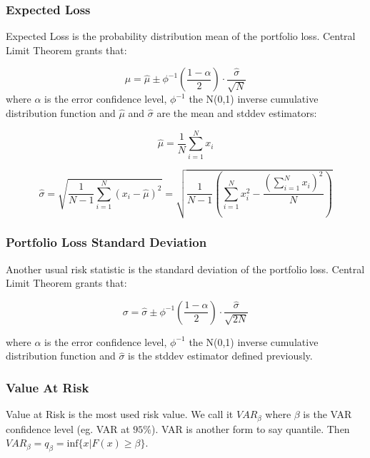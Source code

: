 \documentclass[a4paper,12pt,final]{article}
\begin{document}
\subsubsection{Expected Loss}
Expected Loss is the probability distribution mean of the portfolio loss.
Central Limit Theorem \cite{stats:schaum} grants that:

\begin{displaymath}
\mu = \widehat{\mu} \pm \phi^{-1}\left(\frac{1-\alpha}{2}\right) \cdot \frac{\widehat{\sigma}}{\sqrt{N}}
\end{displaymath}
where $\alpha$ is the error confidence level, $\phi^{-1}$ the N(0,1) inverse 
cumulative distribution function and $\widehat{\mu}$ and $\widehat{\sigma}$ are 
the mean and stddev estimators:

\begin{displaymath}
\widehat{\mu} = \frac{1}{N} \sum_{i=1}^{N} x_i
\end{displaymath}

\begin{displaymath}
\widehat{\sigma} =
\sqrt{\frac{1}{N-1} \sum_{i=1}^{N} \left( x_i - \widehat{\mu} \right)^2} =
\sqrt{\frac{1}{N-1} \left( \sum_{i=1}^{N} x_i^2 - \frac{\left(\sum_{i=1}^{N} x_i \right)^2}{N} \right)}
\end{displaymath}

\subsubsection{Portfolio Loss Standard Deviation}
Another usual risk statistic is the standard deviation of the portfolio loss.
Central Limit Theorem \cite{stats:schaum} grants that:

\begin{displaymath}
\sigma = \widehat{\sigma} \pm \phi^{-1}\left(\frac{1-\alpha}{2}\right) \cdot \frac{\widehat{\sigma}}{\sqrt{2N}}
\end{displaymath}

where $\alpha$ is the error confidence level, $\phi^{-1}$ the N(0,1) inverse 
cumulative distribution function and $\widehat{\sigma}$ is the stddev estimator
defined previously.

\subsubsection{Value At Risk}
Value at Risk \cite{var:jorion} is the most used risk value. We call it 
$VAR_{\beta}$ where $\beta$ is the VAR confidence level (eg. VAR at $95\%$).
VAR is another form to say quantile. Then
$VAR_{\beta} = q_{\beta} = \textrm{inf}\{x | F(x) \geq \beta \}$. 
\end{document}
